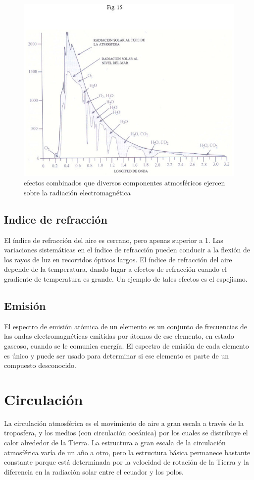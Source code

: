 \documentclass{article}
\begin{document}
\begin{figure}
  \centering
  \includegraphics[scale=0.35]{absorcion.jpg}
  \caption{efectos combinados que diversos componentes atmosféricos ejercen sobre la radiación  electromagnética }
  \label{fig:absorcion}
\end{figure}

\subsection{Indice de refracción}
El índice de refracción del aire es cercano, pero apenas superior a 1. Las variaciones sistemáticas en el índice de refracción pueden conducir a la flexión de los rayos de luz en recorridos ópticos largos.
\newline
El índice de refracción del aire depende de la temperatura, dando lugar a efectos de refracción cuando el gradiente de temperatura es grande. Un ejemplo de tales efectos es el espejismo.

\subsection{Emisión}
El espectro de emisión atómica de un elemento es un conjunto de frecuencias de las ondas electromagnéticas emitidas por átomos de ese elemento, en estado gaseoso, cuando se le comunica energía. El espectro de emisión de cada elemento es único y puede ser usado para determinar si ese elemento es parte de un compuesto desconocido.


\section{Circulación}
La circulación atmosférica es el movimiento de aire a gran escala a través de la troposfera, y los medios (con circulación oceánica) por los cuales se distribuye el calor alrededor de la Tierra. La estructura a gran escala de la circulación atmosférica varía de un año a otro, pero la estructura básica permanece bastante constante porque está determinada por la velocidad de rotación de la Tierra y la diferencia en la radiación solar entre el ecuador y los polos.
\end{document}
